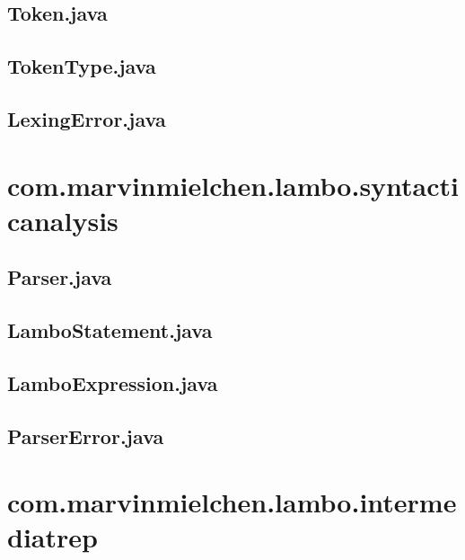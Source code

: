 \documentclass[ngerman]{article}
\begin{document}
\subsection{Token.java}


\subsection{TokenType.java}


\subsection{LexingError.java}


\section{com.marvinmielchen.lambo.syntacticanalysis}

\subsection{Parser.java}


\subsection{LamboStatement.java}


\subsection{LamboExpression.java}


\subsection{ParserError.java}


\section{com.marvinmielchen.lambo.intermediatrep}
\end{document}
